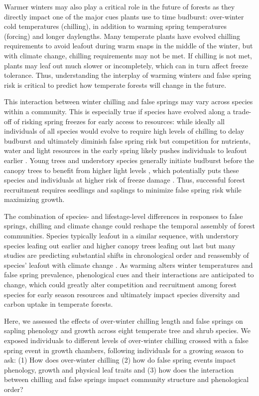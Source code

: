 \documentclass{article}\usepackage[]{graphicx}\usepackage[]{color}
\begin{document}
Warmer winters may also play a critical role in the future of forests as they directly impact one of the  major cues plants use to time budburst: over-winter cold temperatures (chilling), in addition to warming spring temperatures (forcing) and longer daylengths. Many temperate plants have evolved chilling requirements to avoid leafout during warm snaps in the middle of the winter, but with climate change, chilling requirements may not be met. If chilling is not met, plants may leaf out much slower or incompletely, which can in turn affect freeze tolerance. Thus, understanding the interplay of warming winters and false spring risk is critical to predict how temperate forests will change in the future.
  
This interaction between winter chilling and false springs may vary across species within a community. This is especially true if species have evolved along a trade-off of risking spring freezes for early access to resources: while ideally all individuals of all species would evolve to require high levels of chilling to delay budburst and ultimately diminish false spring risk but competition for nutrients, water and light resources in the early spring likely pushes individuals to leafout earlier \citep{Augspurger2013}. Young trees and understory species generally initiate budburst before the canopy trees to benefit from higher light levels \citep {Augspurger2008, Vitasse2013}, which potentially puts these species and individuals at higher risk of freeze damage \citep{Vitasse2014}. Thus, successful forest recruitment requires seedlings and saplings to minimize false spring risk while maximizing growth. 
 
The combination of species- and lifestage-level differences in responses to false springs, chilling and climate change could reshape the temporal assembly of forest communities. Species typically leafout in a similar sequence, with understory species leafing out earlier and higher canopy trees leafing out last but many studies are predicting substantial shifts in chronological order and reassembly of species' leafout with climate change \citep{Roberts2015, Laube2014}. As warming alters winter temperatures and false spring prevalence, phenological cues and their interactions are anticipated to change, which could greatly alter competition and recruitment among forest species for early season resources and ultimately impact species diversity and carbon uptake in temperate forests.
  
Here, we assessed the effects of over-winter chilling length and false springs on sapling phenology and growth across eight temperate tree and shrub species. We exposed individuals to different levels of over-winter chilling crossed with a false spring event in growth chambers, following individuals for a growing season to ask: (1) How does over-winter chilling (2) how do false spring events impact phenology, growth and physical leaf traits and (3) how does the interaction between chilling and false springs impact community structure and phenological order?
\end{document}
